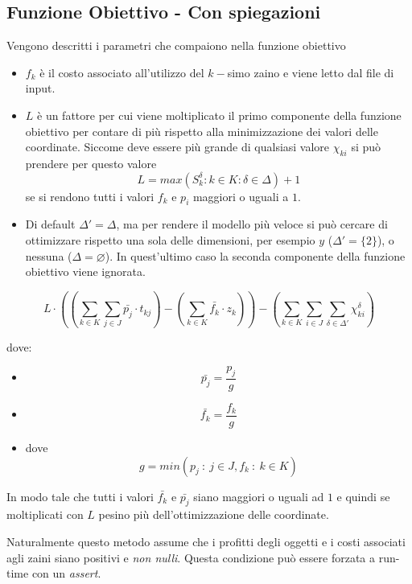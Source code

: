 \documentclass{scrartcl}
\begin{document}
\subsection{Funzione Obiettivo - Con spiegazioni}
Vengono descritti i parametri che compaiono nella funzione obiettivo
\begin{itemize}
	\item $f_k$ è il costo associato all'utilizzo del $k-$simo zaino e viene letto dal file di input.
	\item $L$ è un fattore per cui viene moltiplicato il primo componente della funzione obiettivo per contare
	di più rispetto alla minimizzazione dei valori delle coordinate.
	Siccome deve essere più grande di qualsiasi valore $\chi_{ki}$ si può prendere per questo valore
	$$
	L = max(S_{k}^\delta : k \in K : \delta \in \Delta) + 1
	$$
	se si rendono tutti i valori $f_k$ e $p_i$ maggiori o uguali a $1$.

	\item Di default $\Delta' = \Delta$, ma per rendere il modello più veloce si può cercare di ottimizzare rispetto una sola delle dimensioni, per esempio $y$ ($\Delta' = \{2\}$),	o nessuna ($\Delta = \varnothing$). In quest'ultimo caso
	la seconda componente della funzione obiettivo viene ignorata.
\end{itemize}


\begin{equation}
L \cdot \left(\left( \sum_{k \in K} \sum_{j \in J} \bar{p_{j}} \cdot t_{kj} \right) - \left( \sum_{k \in K} \bar{f_k} \cdot z_k \right) \right)
- \left( \sum_{k \in K}\sum_{i \in J}\sum_{\delta \in \Delta'} \chi_{ki}^\delta \right)
\end{equation}

dove:
\begin{itemize}
	\item $$\bar{p_{j}} = \frac{p_{j}}{g}$$
	\item $$\bar{f_{k}} = \frac{f_{k}}{g}$$
	\item dove 
	$$
	g = min(p_j\ :\ j \in J, f_k\ :\ k \in K)
	$$
\end{itemize}
In modo tale che tutti i valori $\bar{f_k}$ e $\bar{p_j}$ siano maggiori o uguali ad $1$ e quindi se moltiplicati
con $L$ pesino più dell'ottimizzazione delle coordinate.

Naturalmente questo metodo assume che i profitti degli oggetti e i costi associati agli zaini siano positivi e \emph{non nulli}.
Questa condizione può essere forzata a run-time con un \textit{assert}.
\end{document}
